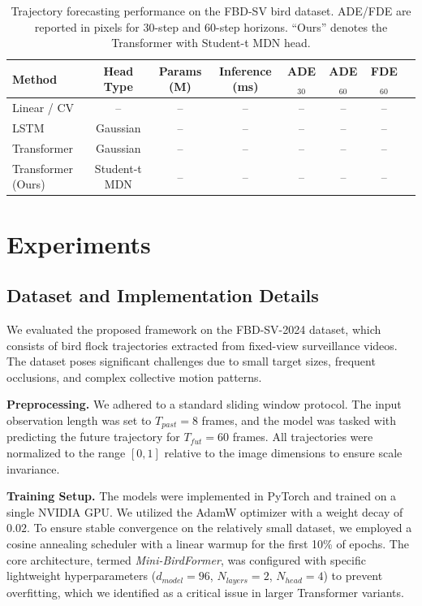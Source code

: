 \documentclass[11pt]{article}
\begin{document}
\begin{table}[t]
	\centering
	\caption{Trajectory forecasting performance on the FBD-SV bird dataset.
		ADE/FDE are reported in pixels for 30-step and 60-step horizons.
		``Ours'' denotes the Transformer with Student-t MDN head.}
	\label{tab:main_results}
	\begin{tabular}{lccccccc}
		\toprule
		Method & Head Type & Params (M) & Inference (ms) & ADE$_{30}$ & ADE$_{60}$ & FDE$_{60}$ \\
		\midrule
		Linear / CV          & --              & --           & --          & --        & --        & --        \\
		LSTM                 & Gaussian        & --           & --          & --        & --        & --        \\
		Transformer          & Gaussian        & --           & --          & --        & --        & --        \\
		Transformer (Ours)   & Student-t MDN   & --           & --          & --        & --        & --        \\
		\bottomrule
	\end{tabular}
\end{table}

\section{Experiments}
\label{sec:experiments}

\subsection{Dataset and Implementation Details}
We evaluated the proposed framework on the FBD-SV-2024 dataset, which consists of bird flock trajectories extracted from fixed-view surveillance videos. The dataset poses significant challenges due to small target sizes, frequent occlusions, and complex collective motion patterns. 

\textbf{Preprocessing.} We adhered to a standard sliding window protocol. The input observation length was set to $T_{past}=8$ frames, and the model was tasked with predicting the future trajectory for $T_{fut}=60$ frames. All trajectories were normalized to the range $[0, 1]$ relative to the image dimensions to ensure scale invariance.

\textbf{Training Setup.} The models were implemented in PyTorch and trained on a single NVIDIA GPU. We utilized the AdamW optimizer with a weight decay of $0.02$. To ensure stable convergence on the relatively small dataset, we employed a cosine annealing scheduler with a linear warmup for the first 10\% of epochs. The core architecture, termed \textit{Mini-BirdFormer}, was configured with specific lightweight hyperparameters ($d_{model}=96$, $N_{layers}=2$, $N_{head}=4$) to prevent overfitting, which we identified as a critical issue in larger Transformer variants.
\end{document}
